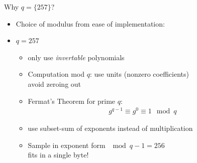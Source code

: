 \documentclass[10pt]{beamer}
\begin{document}
\begin{frame}{Why $q=\{257\}$?}
  \begin{itemize}
    \item Choice of modulus from ease of implementation: 
    \item $q=257$
      \begin{itemize}
        \item only use \emph{invertable} polynomials \pause \\ 
        \item Computation mod $q$: use units (nonzero coefficients) \pause \\
          avoid zeroing out 
        \item Fermat's Theorem for prime $q$: 
          \begin{align*}
            g^{q-1}\equiv g^0 \equiv 1 \mod q 
          \end{align*}\pause
        \item use subset-sum of exponents instead of multiplication \pause
        \item Sample in exponent form $\mod q-1= 256$\pause \\ 
          fits in a single byte!
      \end{itemize}
  \end{itemize}
\end{frame}
\end{document}
